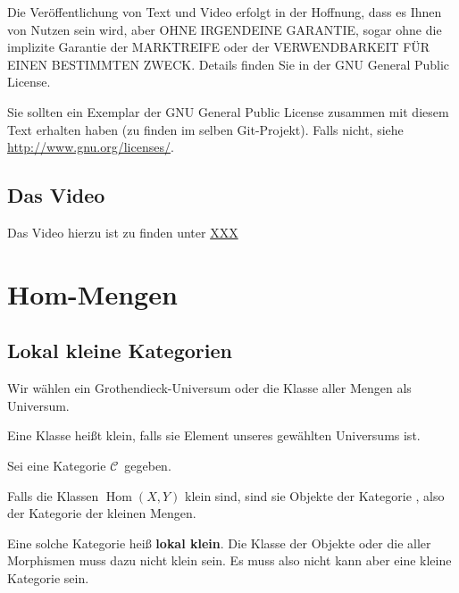 \documentclass[a4paper]{amsart}
\theoremstyle{definition}
\DeclareMathOperator{\Hom}{Hom}
\newcommand{\CC}{\ensuremath{\mathcal{ C }}}
\newcommand{\Set}{\text{\textbf{Set}}}
\begin{document}
Die Veröffentlichung von Text und Video erfolgt in der Hoffnung, dass es Ihnen von Nutzen sein wird,
aber OHNE IRGENDEINE GARANTIE, sogar ohne die implizite Garantie der MARKTREIFE oder der
VERWENDBARKEIT FÜR EINEN BESTIMMTEN ZWECK. Details finden Sie in der GNU General Public License.

Sie sollten ein Exemplar der GNU General Public License zusammen mit diesem Text erhalten haben
(zu finden im selben Git-Projekt).
Falls nicht, siehe \url{http://www.gnu.org/licenses/}.

\subsection*{Das Video}
Das Video hierzu ist zu finden unter
{\tiny
   \url{XXX}
}

\section{Hom-Mengen}

\subsection{Lokal kleine Kategorien}
Wir wählen ein Grothendieck-Universum oder die Klasse aller Mengen als Universum.

Eine Klasse heißt klein, falls sie Element unseres gewählten Universums ist. 

Sei eine Kategorie \CC\ gegeben.

Falls die Klassen $\Hom(X,Y)$ klein sind, sind sie Objekte der Kategorie \Set, also der Kategorie der kleinen Mengen.

Eine solche Kategorie heiß \textbf{lokal klein}. Die Klasse der Objekte oder die aller Morphismen muss dazu nicht klein sein. Es muss also nicht kann aber eine kleine Kategorie sein.
\end{document}
